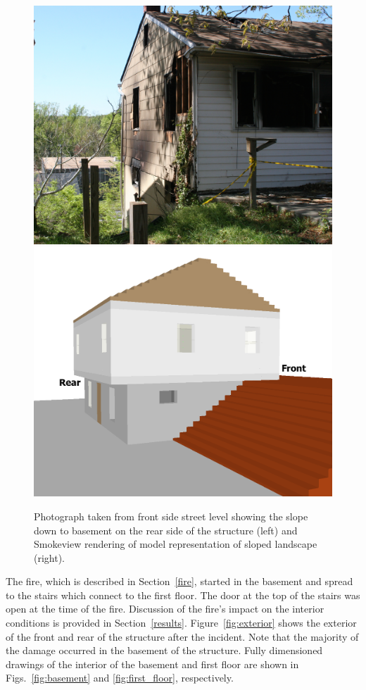 \documentclass[12pt,oneside]{book}
\begin{document}
\begin{figure}[!ht]
\includegraphics[width=.5\textwidth]{../Figures/PGCo_Slope}
\includegraphics[width=.5\textwidth]{../Figures/pg_county_slope} \\
\caption[Photograph and computer model rendering of terrain.]{Photograph taken from front side street level showing the slope down to basement on the rear side of the structure (left) and Smokeview rendering of model representation of sloped landscape (right).}
\label{fig:slope}
\end{figure}

The fire, which is described in Section~\ref{fire}, started in the basement and spread to the stairs which connect to the first floor. The door at the top of the stairs was open at the time of the fire. Discussion of the fire's impact on the interior conditions is provided in Section~\ref{results}. Figure~\ref{fig:exterior} shows the exterior of the front and rear of the structure after the incident. Note that the majority of the damage occurred in the basement of the structure. Fully dimensioned drawings of the interior of the basement and first floor are shown in Figs.~\ref{fig:basement} and \ref{fig:first_floor}, respectively.
\end{document}
